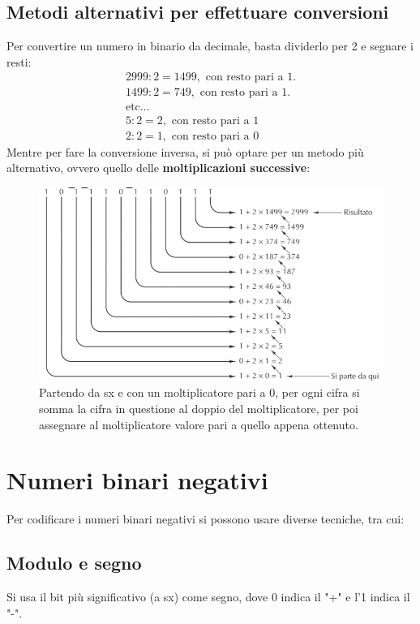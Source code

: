 \documentclass[12pt]{article}
\begin{document}
\subsection{Metodi alternativi per effettuare conversioni}
Per convertire un numero in binario da decimale, basta dividerlo per 2 e segnare i resti:
\begin{gather*}
    2999 : 2 = 1499, \text{ con resto pari a } 1.\\
    1499 : 2 = 749, \text{ con resto pari a } 1.\\
    \text{etc} \dots \\
    5 : 2 = 2, \text{ con resto pari a } 1\\
    2 : 2 = 1, \text{ con resto pari a } 0
\end{gather*}
Mentre per fare la conversione inversa, si può optare per un metodo più alternativo, ovvero quello delle \textbf{moltiplicazioni successive}:
\begin{figure}[!htb]
    \centering
    \includegraphics[width=.9\linewidth,height=.40\textheight,keepaspectratio]{rappresentazione_dati/mult_succ.PNG} %
    \begin{center}
        \caption{\label{fig:moltiplicazioni_successive}Partendo da sx e con un moltiplicatore pari a 0, per ogni cifra si somma la cifra in questione al doppio del moltiplicatore, per poi assegnare al moltiplicatore valore pari a quello appena ottenuto.}
    \end{center}
\end{figure}
\section{Numeri binari negativi}
Per codificare i numeri binari negativi si possono usare diverse tecniche, tra cui:
\subsection{Modulo e segno}
Si usa il bit più significativo (a sx) come segno, dove 0 indica il "+" e l'1 indica il "-".
\end{document}
